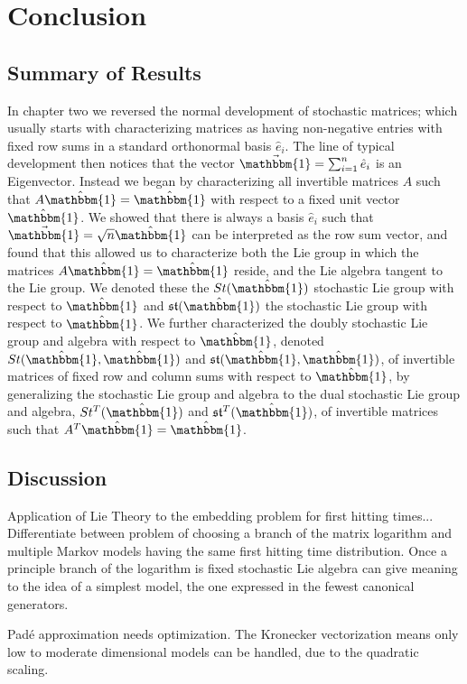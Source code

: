 \chapter{Conclusion}

\section{Summary of Results}
In chapter two we reversed the normal development of stochastic matrices; which
usually starts with characterizing matrices as having non-negative entries with
fixed row sums in a standard orthonormal basis $\hat{e}_i$. The line of typical
development then notices that the vector $\vec{\mathbbm{1}} = \sum_{i=1}^n \hat{e}_i$
is an Eigenvector. Instead we began by characterizing all invertible matrices $A$ 
such that $A \hat{\mathbbm{1}} = \hat{\mathbbm{1}}$ with respect to a fixed unit 
vector $\hat{\mathbbm{1}}$. We showed that there is always a basis $\hat{e}_i$ 
such that $\vec{\mathbbm{1}} = \sqrt{n} \hat{\mathbbm{1}}$ can be interpreted as 
the row sum vector, and found that this allowed us to characterize both the Lie 
group in which the matrices $A \hat{\mathbbm{1}} = \hat{\mathbbm{1}}$ reside, 
and the Lie algebra tangent to the Lie group. We denoted these the $St(\hat{\mathbbm{1}})$ 
stochastic Lie group with respect to $\hat{\mathbbm{1}}$ and $\mathfrak{st}(\hat{\mathbbm{1}})$ 
the stochastic Lie group with respect to $\hat{\mathbbm{1}}$. We further 
characterized the doubly stochastic Lie group and algebra with respect to $\hat{\mathbbm{1}}$, 
denoted $St(\hat{\mathbbm{1}}, \hat{\mathbbm{1}})$ and $\mathfrak{st}(\hat{\mathbbm{1}}, \hat{\mathbbm{1}})$,
of invertible matrices of fixed row and column sums with respect to $\hat{\mathbbm{1}}$,
by generalizing the stochastic Lie group and algebra to the dual stochastic Lie
group and algebra, $St^T(\hat{\mathbbm{1}})$ and $\mathfrak{st}^T(\hat{\mathbbm{1}})$, 
of invertible matrices such that $A^T \hat{\mathbbm{1}} = \hat{\mathbbm{1}}$.

\section{Discussion}
Application of Lie Theory to the embedding problem for first hitting times...
Differentiate between problem of choosing a branch of the matrix logarithm
and multiple Markov models having the same first hitting time distribution.
Once a principle branch of the logarithm is fixed stochastic Lie algebra can 
give meaning to the idea of a simplest model, the one expressed in the fewest 
canonical generators.

Pad\'{e} approximation needs optimization. The Kronecker vectorization means 
only low to moderate dimensional models can be handled, due to the quadratic
scaling.